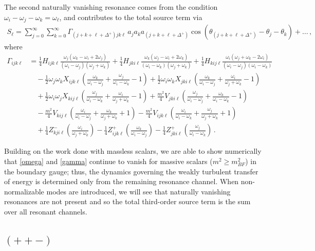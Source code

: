 \documentclass[letterpaper,11pt]{article}
\newcommand{\oi}{\omega_i}
\newcommand{\oj}{\omega_j}
\newcommand{\ok}{\omega_k}
\newcommand{\ol}{\omega_\ell}
\newcommand{\thj}{\theta_j}
\newcommand{\thk}{\theta_k}
\begin{document}
The second naturally vanishing resonance comes from the condition $\oi - \oj - \ok = \ol$, and contributes to the total source term via
\begin{align}
S_\ell = \sum_{j=0}^\infty \sum_{k=0}^\infty \Gamma_{(j + k + \ell + \Delta^+) jk\ell} \, a_j a_k a_{(j+k+\ell + \Delta^+)} \cos \left( \theta_{(j+k+\ell + \Delta^+)} - \thj - \thk \right) + \ldots \, ,
\end{align}
where
\begin{align}
\label{gamma}
\Gamma_{ijk\ell} &= \frac{1}{4} H_{ijk\ell} \frac{\oj (\ok - \oi + 2\oj)}{(\oi - \oj)(\oj + \ok)} + \frac{1}{4} H_{jki\ell} \frac{\ok (\oj - \oi + 2\ok)}{(\oi - \ok)(\oj + \ok)} + \frac{1}{4} H_{kij\ell} \frac{\oi (\oj + \ok - 2\oi)}{(\oi - \oj)(\oi - \ok)} \nonumber \\
% 
& \quad -\frac{1}{2} \oj \ok X_{ijk\ell} \left( \frac{\ok}{\oi - \oj} + \frac{\oj}{\oi - \ok} - 1\right) + \frac{1}{2} \oi \ok X_{jki\ell} \left( \frac{\ok}{\oi - \oj} + \frac{\oi}{\oj + \ok} - 1 \right) \nonumber \\
%
& \quad + \frac{1}{2} \oi \oj X_{kij\ell} \left( \frac{\oj}{\oi - \ok} + \frac{\oi}{\oj + \ok} -1 \right) + \frac{m^2}{4} V_{jki\ell} \left( \frac{\oj}{\oi - \oj} + \frac{\ok}{\oi - \ok} -1\right) \nonumber \\
%
& \quad - \frac{m^2}{4} V_{kij\ell} \left( \frac{\oi}{\oi - \oj} + \frac{\ok}{\oj + \ok} + 1\right) - \frac{m^2}{4} V_{ijk\ell} \left( \frac{\oi}{\oi - \ok} + \frac{\oj}{\oj + \ok} + 1 \right) \nonumber \\
%
& \quad + \frac{1}{4} Z^-_{kji\ell} \left( \frac{\oi}{\oj + \ok}\right) - \frac{1}{4} Z^+_{ijk\ell} \left( \frac{\ok}{\oi - \oj} \right) - \frac{1}{4} Z^+_{jki\ell} \left( \frac{\oj}{\oi - \ok}\right) \, .
\end{align}

Building on the work done with massless scalars, we are able to show numerically that \eqref{omega} and \eqref{gamma} continue to vanish for massive scalars ($m^2 \geq m^2_{BF}$) in the boundary gauge; thus, the dynamics governing the weakly turbulent transfer of energy is determined only from the remaining resonance channel. When non-normalizable modes are introduced, we will see that naturally vanishing resonances are not present and so the total third-order source term is the sum over all resonant channels.


\subsection{$(++-)$}
\label{subs: ttf resonances}
\end{document}
